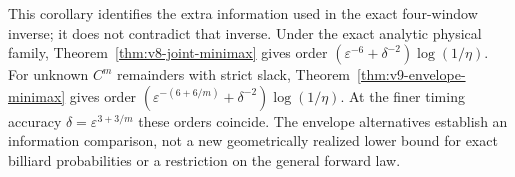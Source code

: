 This corollary identifies the extra information used in the exact
four-window inverse; it does not contradict that inverse. Under the
exact analytic physical family, Theorem~\ref{thm:v8-joint-minimax}
gives order $(\varepsilon^{-6}+\delta^{-2})\log(1/\eta)$.
For unknown $C^m$ remainders with strict slack,
Theorem~\ref{thm:v9-envelope-minimax} gives order
$(\varepsilon^{-(6+6/m)}+\delta^{-2})\log(1/\eta)$.
At the finer timing accuracy $\delta=\varepsilon^{3+3/m}$ these
orders coincide. The envelope alternatives establish an information
comparison, not a new geometrically realized lower bound for exact
billiard probabilities or a restriction on the general forward law.
